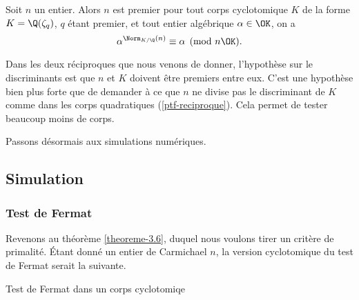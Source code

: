 \begin{theoreme}
	Soit $n$ un entier. Alors $n$ est premier \ssi pour tout corps cyclotomique $K$ de la forme $K = \Q(\zeta_q)$, $q$ étant premier, et tout entier algébrique $\alpha\in \OK$, on a $$\alpha^{\Norm_{K/\Q}(n)} \equiv \alpha \pmod{n\OK}.$$
\end{theoreme}

\begin{remarque}
	Dans les deux réciproques que nous venons de donner, l'hypothèse sur le discriminants est que $n$ et $K$ doivent être premiers entre eux. C'est une hypothèse bien plus forte que de demander à ce que $n$ ne divise pas le discriminant de $K$ comme dans les corps quadratiques (\ref{ptf-reciproque}). Cela permet de tester beaucoup moins de corps.
\end{remarque}

Passons désormais aux simulations numériques.

\subsection{Simulation}

\subsubsection{Test de Fermat}

Revenons au théorème \ref{theoreme-3.6}, duquel nous voulons tirer un critère de primalité. Étant donné un entier de Carmichael $n$, la version \og cyclotomique \fg{} du test de Fermat serait la suivante.

\vspace{1em}
\begin{algorithm}[H]\label{test-Fermat-cyclotomique}
\caption{Test de Fermat dans un corps cyclotomiqe}
\end{algorithm}
\vspace{1em}

